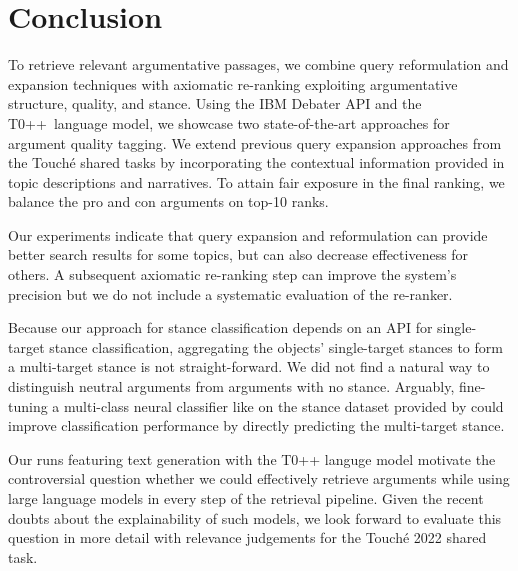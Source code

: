 \section{Conclusion}

To retrieve relevant argumentative passages, we combine query reformulation and expansion techniques with axiomatic re-ranking exploiting argumentative structure, quality, and stance.
Using the IBM Debater API and the T0++~language model, we showcase two state-of-the-art approaches for argument quality tagging.
We extend previous query expansion approaches from the Touché shared tasks by incorporating the contextual information provided in topic descriptions and narratives.
To attain fair exposure in the final ranking, we balance the pro and con arguments on top-10 ranks.

Our experiments indicate that query expansion and reformulation can provide better search results for some topics, but can also decrease effectiveness for others.
A subsequent axiomatic re-ranking step can improve the system's precision but we do not include a systematic evaluation of the re-ranker. 

Because our approach for stance classification depends on an API for single-target stance classification, aggregating the objects' single-target stances to form a multi-target stance is not straight-forward.
We did not find a natural way to distinguish neutral arguments from arguments with no stance.
Arguably, fine-tuning a multi-class neural classifier like \Bert on the stance dataset provided by \citeauthor{BondarenkoFKSGBPBSWPH2022} could improve classification performance by directly predicting the multi-target stance.

Our runs featuring text generation with the T0++ languge model motivate the controversial question whether we could effectively retrieve arguments while using large language models in every step of the retrieval pipeline.
Given the recent doubts about the explainability of such models, we look forward to evaluate this question in more detail with relevance judgements for the Touché 2022 shared task.
